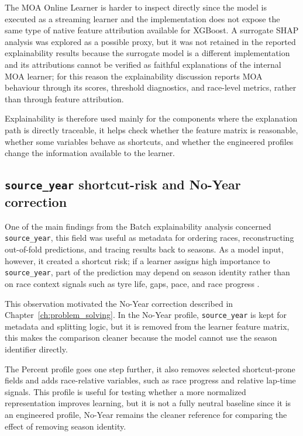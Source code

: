 The MOA Online Learner is harder to inspect directly since the model is executed as a streaming learner and the implementation does not expose the same type of native feature 
attribution available for XGBoost. A surrogate SHAP analysis was explored as a possible proxy, but it was not retained in the reported explainability results because the 
surrogate model is a different implementation and its attributions cannot be verified as faithful explanations of the internal MOA learner; for this reason the 
explainability discussion reports MOA behaviour through its scores, threshold diagnostics, and race-level metrics, rather than through feature attribution.

Explainability is therefore used mainly for the components where the explanation path is directly traceable,
it helps check whether the feature matrix is reasonable, whether some variables behave 
as shortcuts, and whether the engineered profiles change the information available to the learner.

\subsection{\texttt{source\_year} shortcut-risk and No-Year correction}

One of the main findings from the Batch explainability analysis concerned \texttt{source\_year}, this field was useful as metadata for ordering races, reconstructing 
out-of-fold predictions, and tracing results back to seasons. As a model input, however, it created a shortcut risk; if a learner assigns high importance to 
\texttt{source\_year}, part of the prediction may depend on season identity rather than on race context signals such as tyre life, gaps, pace, and race progress 
\cite{brookshire2024leakage}.

This observation motivated the No-Year correction described in Chapter~\ref{ch:problem_solving}. In the No-Year profile, \texttt{source\_year} is kept for metadata and 
splitting logic, but it is removed from the learner feature matrix, this makes the comparison cleaner because the model cannot use the season identifier directly.

The Percent profile goes one step further, it also removes selected shortcut-prone fields and adds race-relative variables, such as race progress and relative lap-time signals. 
This profile is useful for testing whether a more normalized representation improves learning, but it is not a fully neutral baseline since it is an engineered profile, No-Year 
remains the cleaner reference for comparing the effect of removing season identity.

